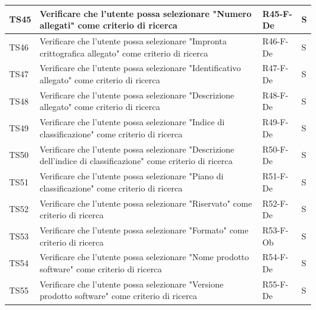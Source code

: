 \documentclass[a4paper,12pt]{article}
\begin{document}
\begin{longtable}{|M{1.2cm}|M{6.3cm}|M{2.5cm}|M{1.5cm}|}
                TS45 & Verificare che l'utente possa selezionare "Numero allegati" come criterio di ricerca & R45-F-De & S \\
                \hline

                TS46 & Verificare che l'utente possa selezionare "Impronta crittografica allegato" come criterio di ricerca & R46-F-De & S \\
                \hline

                TS47 & Verificare che l'utente possa selezionare "Identificativo allegato" come criterio di ricerca & R47-F-De & S \\
                \hline

                TS48 & Verificare che l'utente possa selezionare "Descrizione allegato" come criterio di ricerca & R48-F-De & S \\
                \hline

                TS49 & Verificare che l'utente possa selezionare "Indice di classificazione" come criterio di ricerca & R49-F-De & S \\
                \hline

                TS50 & Verificare che l'utente possa selezionare "Descrizione dell'indice di classificazione" come criterio di ricerca & R50-F-De & S \\
                \hline

                TS51 & Verificare che l'utente possa selezionare "Piano di classificazione" come criterio di ricerca & R51-F-De & S \\
                \hline

                TS52 & Verificare che l'utente possa selezionare "Riservato" come criterio di ricerca & R52-F-De & S \\
                \hline

                TS53 & Verificare che l'utente possa selezionare "Formato" come criterio di ricerca & R53-F-Ob & S \\
                \hline

                TS54 & Verificare che l'utente possa selezionare "Nome prodotto software" come criterio di ricerca & R54-F-De & S \\
                \hline

                TS55 & Verificare che l'utente possa selezionare "Versione prodotto software" come criterio di ricerca & R55-F-De & S \\
                \hline


\end{longtable}
\end{document}
